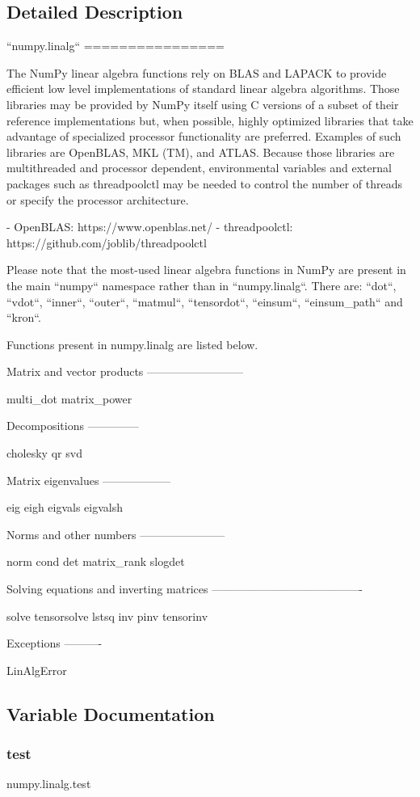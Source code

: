 \subsection{Detailed Description}
\begin{DoxyVerb}``numpy.linalg``
================

The NumPy linear algebra functions rely on BLAS and LAPACK to provide efficient
low level implementations of standard linear algebra algorithms. Those
libraries may be provided by NumPy itself using C versions of a subset of their
reference implementations but, when possible, highly optimized libraries that
take advantage of specialized processor functionality are preferred. Examples
of such libraries are OpenBLAS, MKL (TM), and ATLAS. Because those libraries
are multithreaded and processor dependent, environmental variables and external
packages such as threadpoolctl may be needed to control the number of threads
or specify the processor architecture.

- OpenBLAS: https://www.openblas.net/
- threadpoolctl: https://github.com/joblib/threadpoolctl

Please note that the most-used linear algebra functions in NumPy are present in
the main ``numpy`` namespace rather than in ``numpy.linalg``.  There are:
``dot``, ``vdot``, ``inner``, ``outer``, ``matmul``, ``tensordot``, ``einsum``,
``einsum_path`` and ``kron``.

Functions present in numpy.linalg are listed below.


Matrix and vector products
--------------------------

   multi_dot
   matrix_power

Decompositions
--------------

   cholesky
   qr
   svd

Matrix eigenvalues
------------------

   eig
   eigh
   eigvals
   eigvalsh

Norms and other numbers
-----------------------

   norm
   cond
   det
   matrix_rank
   slogdet

Solving equations and inverting matrices
----------------------------------------

   solve
   tensorsolve
   lstsq
   inv
   pinv
   tensorinv

Exceptions
----------

   LinAlgError\end{DoxyVerb}
 

\subsection{Variable Documentation}
\mbox{\label{namespacenumpy_1_1linalg_ad3c8c6b67058d83f35678d387a965770}} 
\subsubsection{\texorpdfstring{test}{test}}
{\footnotesize\ttfamily numpy.\+linalg.\+test}

